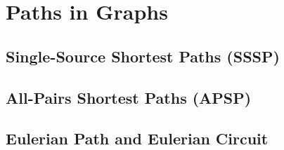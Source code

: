 
\chapter{Paths in Graphs}	\label{chapter:graph-paths}

\section{Single-Source Shortest Paths (SSSP)}	\label{section:sssp}



\section{All-Pairs Shortest Paths (APSP)}	\label{section:apsp}



\section{Eulerian Path and Eulerian Circuit}	\label{section:eulerian-path}


